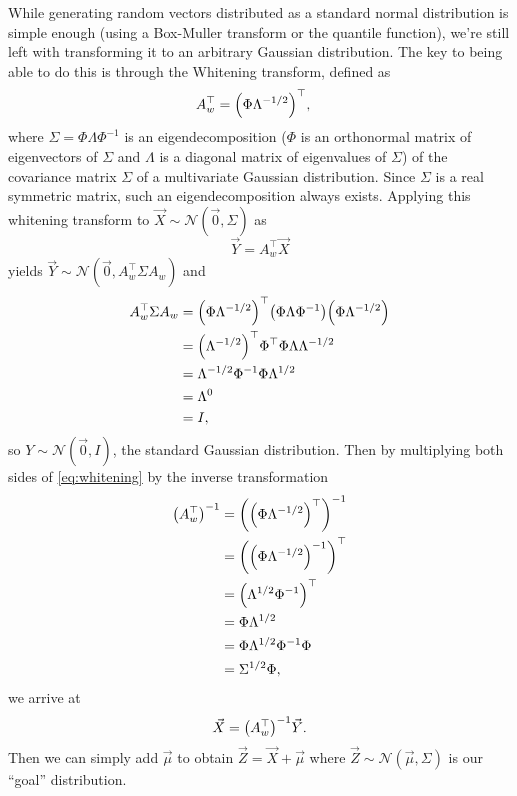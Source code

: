 \documentclass[headings=optiontoheadandtoc,listof=totoc,parskip=full]{scrartcl}
\begin{document}
While generating random vectors distributed as a standard normal distribution is simple enough (using a Box-Muller transform or the quantile function), we're still left with transforming it to an arbitrary Gaussian distribution. The key to being able to do this is through the Whitening transform, defined as
\begin{align}
	A_w^\top &= \qty(\Phi \Lambda^{-1/2})^\top,
\end{align}
where $\Sigma = \Phi \Lambda \Phi^{-1}$ is an eigendecomposition ($\Phi$ is an orthonormal matrix of eigenvectors of $\Sigma$ and $\Lambda$ is a diagonal matrix of eigenvalues of $\Sigma$) of the covariance matrix $\Sigma$ of a multivariate Gaussian distribution. Since $\Sigma$ is a real symmetric matrix, such an eigendecomposition always exists. Applying this whitening transform to $\vec X \sim \mathcal N(\vec 0, \Sigma)$ as
\begin{equation}
	\vec Y = A_w^\top \vec X \label{eq:whitening}
\end{equation}
yields $\vec Y \sim \mathcal N(\vec 0, A_w^\top \Sigma A_w)$ and
\begin{align*}
	A_w^\top \Sigma A_w &= \qty(\Phi \Lambda^{-1/2})^\top \qty(\Phi \Lambda \Phi^{-1}) \qty(\Phi \Lambda^{-1/2})\\
		&= \qty(\Lambda^{-1/2})^\top \Phi^\top \Phi \Lambda \Lambda^{-1/2}\\
		&= \Lambda^{-1/2} \Phi^{-1} \Phi \Lambda^{1/2}\\
		&= \Lambda^0\\
		&= I,
\end{align*}
so $Y \sim \mathcal N(\vec 0, I)$, the standard Gaussian distribution. Then by multiplying both sides of \cref{eq:whitening} by the inverse transformation
\begin{equation}
	\begin{split}
		\qty(A_w^\top)^{-1} &= \qty(\qty(\Phi \Lambda^{-1/2})^\top)^{-1}\\
			&= \qty(\qty(\Phi \Lambda^{-1/2})^{-1})^\top\\
			&= \qty(\Lambda^{1/2}\Phi^{-1})^\top\\
			&= \Phi\Lambda^{1/2}\\
			&= \Phi\Lambda^{1/2}\Phi^{-1}\Phi\\
			&= \Sigma^{1/2}\Phi, \label{eq:inverse-whitening}
	\end{split}
\end{equation}
we arrive at
\begin{equation}
	\vec X = \qty(A_w^\top)^{-1} \vec Y.
\end{equation}
Then we can simply add $\vec \mu$ to obtain $\vec Z = \vec X + \vec \mu$ where $\vec Z \sim \mathcal N(\vec \mu, \Sigma)$ is our ``goal'' distribution.
\end{document}
